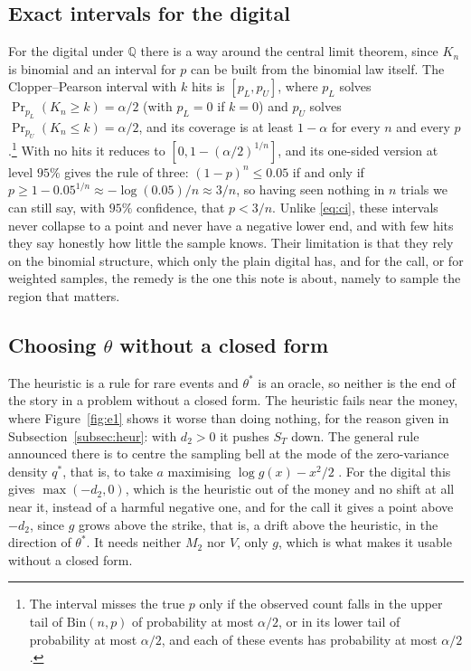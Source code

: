 \documentclass[11pt,a4paper]{article}
\theoremstyle{plain}
\theoremstyle{definition}
\theoremstyle{remark}
\newcommand{\Q}{\mathbb{Q}}
\newcommand{\1}{\mathbf{1}}
\begin{document}
\subsection{Exact intervals for the digital}
\label{subsec:exact}

For the digital under $\Q$ there is a way around the central limit theorem, since $K_n$ is binomial and an interval for $p$ can be built from the binomial law itself. The Clopper--Pearson interval with $k$ hits is $[p_L, p_U]$, where $p_L$ solves $\Pr_{p_L}(K_n \ge k) = \alpha/2$ (with $p_L = 0$ if $k = 0$) and $p_U$ solves $\Pr_{p_U}(K_n \le k) = \alpha/2$, and its coverage is at least $1 - \alpha$ for every $n$ and every $p$.\footnote{The interval misses the true $p$ only if the observed count falls in the upper tail of $\mathrm{Bin}(n, p)$ of probability at most $\alpha/2$, or in its lower tail of probability at most $\alpha/2$, and each of these events has probability at most $\alpha/2$.} With no hits it reduces to $[0, 1 - (\alpha/2)^{1/n}]$, and its one-sided version at level $95\%$ gives the rule of three: $(1 - p)^n \le 0.05$ if and only if $p \ge 1 - 0.05^{1/n} \approx -\log(0.05)/n \approx 3/n$, so having seen nothing in $n$ trials we can still say, with $95\%$ confidence, that $p < 3/n$. Unlike \eqref{eq:ci}, these intervals never collapse to a point and never have a negative lower end, and with few hits they say honestly how little the sample knows. Their limitation is that they rely on the binomial structure, which only the plain digital has, and for the call, or for weighted samples, the remedy is the one this note is about, namely to sample the region that matters.

\subsection{Choosing \texorpdfstring{$\theta$}{theta} without a closed form}
\label{subsec:choose}

The heuristic is a rule for rare events and $\theta^*$ is an oracle, so neither is the end of the story in a problem without a closed form. The heuristic fails near the money, where Figure~\ref{fig:e1} shows it worse than doing nothing, for the reason given in Subsection~\ref{subsec:heur}: with $d_2 > 0$ it pushes $S_T$ down. The general rule announced there is to centre the sampling bell at the mode of the zero-variance density $q^*$, that is, to take $a$ maximising $\log g(x) - x^2/2$ \cite[\S 4.6.2, (4.90)]{glasserman}. For the digital this gives $\max(-d_2, 0)$, which is the heuristic out of the money and no shift at all near it, instead of a harmful negative one, and for the call it gives a point above $-d_2$, since $g$ grows above the strike, that is, a drift above the heuristic, in the direction of $\theta^*$. It needs neither $M_2$ nor $V$, only $g$, which is what makes it usable without a closed form.
\end{document}
